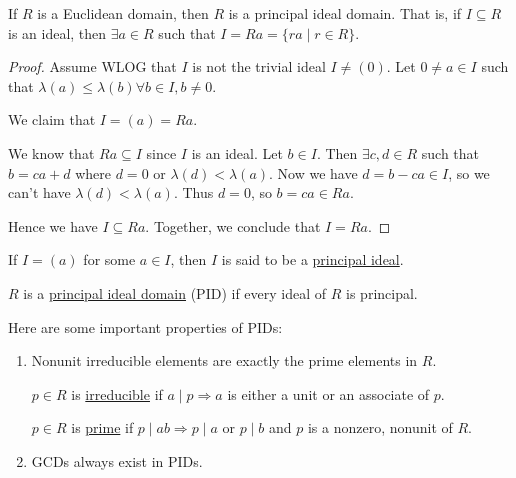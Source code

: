 \begin{proposition}
    If $R$ is a Euclidean domain, then $R$ is a principal ideal domain. That is, if $I\subseteq R$ is an ideal, then $\exists a\in R$ such that $I = Ra = \{ra\mid r\in R\}$.
\end{proposition}
\begin{proof}
    Assume WLOG that $I$ is not the trivial ideal $I\neq (0)$. Let $0\neq a\in I$ such that $\lambda(a)\leq \lambda(b) \forall b\in I, b\neq 0$.

    We claim that $I = (a) = Ra$.

    We know that $Ra\subseteq I$ since $I$ is an ideal. Let $b\in I$. Then $\exists c, d\in R$ such that $b = ca + d$ where $d = 0$ or $\lambda(d) < \lambda(a)$. Now we have $d = b-ca\in I$, so we can't have $\lambda(d) < \lambda(a)$. Thus $d = 0$, so $b=ca\in Ra$.

    Hence we have $I\subseteq Ra$. Together, we conclude that $I = Ra$.
\end{proof}

\begin{definition}
    If $I = (a)$ for some $a\in I$, then $I$ is said to be a \ul{principal ideal}.

    $R$ is a \ul{principal ideal domain} (PID) if every ideal of $R$ is principal.
\end{definition}

Here are some important properties of PIDs:
\begin{enumerate}
    \item Nonunit irreducible elements are exactly the prime elements in $R$.

          \recall $p\in R$ is \ul{irreducible} if $a\mid p\Rightarrow a$ is either a unit or an associate of $p$.

          $p\in R$ is \ul{prime} if $p\mid ab\Rightarrow p\mid a$ or $p\mid b$ and $p$ is a nonzero, nonunit of $R$.

    \item GCDs always exist in PIDs.
\end{enumerate}

